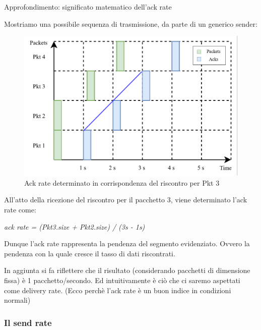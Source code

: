 \begin{approfondimento}{Approfondimento: significato matematico dell'ack rate}

Mostriamo una possibile sequenza di trasmissione, da parte di un generico sender:

\begin{figure}[H]

\center
\caption{Ack rate determinato in corrispondenza del riscontro per Pkt 3}
\includegraphics[scale=1.1]{chapters/3_bbr/img/ack_rate}

\end{figure}

All'atto della ricezione del riscontro per il pacchetto 3, viene determinato l'ack rate come:

\begin{center}

\textit{ack rate = (Pkt3.size + Pkt2.size) / (3s - 1s)}

\end{center}

Dunque l'ack rate rappresenta la pendenza del segmento evidenziato. Ovvero la pendenza con la quale cresce il tasso di dati riscontrati. \bigskip

In aggiunta si fa riflettere che il risultato (considerando pacchetti di dimensione fissa) è 1 pacchetto/secondo. Ed intuitivamente è ciò che ci saremo aspettati come delivery rate. (Ecco perchè l'ack rate è un buon indice in condizioni normali) \bigskip 

\end{approfondimento}

\subsubsection{Il send rate}

